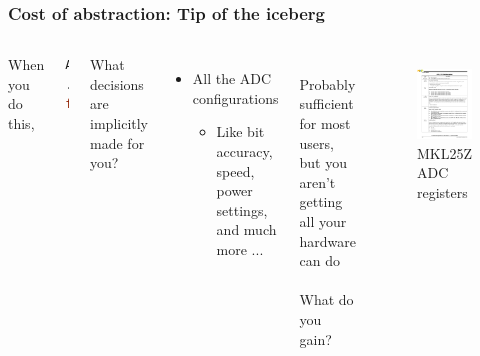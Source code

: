 \documentclass{beamer}
\begin{document}
\begin{frame}[fragile]
\frametitle{Cost of abstraction: Tip of the iceberg}
\begin{columns}[t]
When you do this,
\begin{lstlisting}[language=C++,basicstyle=\ttfamily\tiny]
AnalogIn my_adc(PTC2);
...
float adc_val = my_adc;
\end{lstlisting}
What decisions are implicitly made for you? \\
 {
\begin{itemize}
  \item All the ADC configurations
  \begin{itemize}
    \item Like bit accuracy, speed, power settings, and much more ...
  \end{itemize}
\end{itemize}
\hfill \\
Probably sufficient for most users, but you aren't getting all your hardware can do \\
\hfill \\
What do you gain?
}
 {
\begin{figure}[h!]
\includegraphics[width=\columnwidth]{external/mkl25z-adccfg1} \\
MKL25Z ADC registers
\end{figure}
}
\end{columns}
\end{frame}
\end{document}
